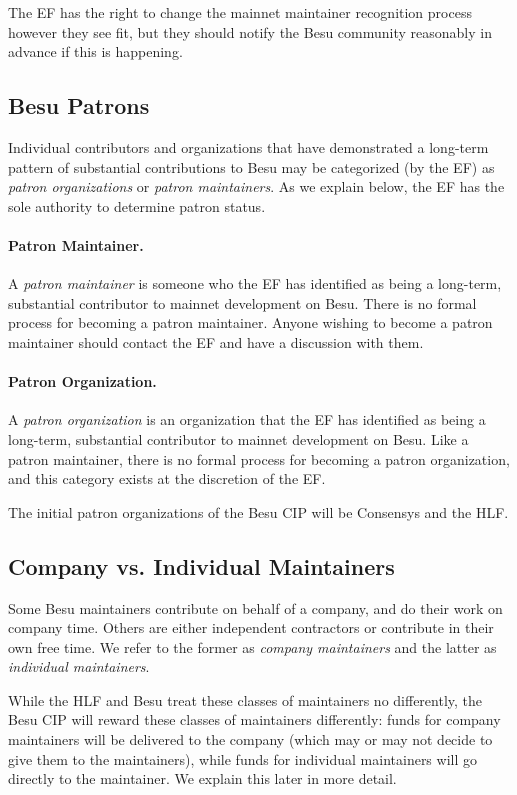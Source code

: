 The EF has the right to change the mainnet maintainer recognition process however they see fit, but they should notify the Besu community reasonably in advance if this is happening.

\subsection{Besu Patrons}
Individual contributors and organizations that have demonstrated a long-term pattern of substantial contributions to Besu may be categorized (by the EF) as \emph{patron organizations} or \emph{patron maintainers}.  As we explain below, the EF has the sole authority to determine patron status.

\paragraph{Patron Maintainer.}  A \emph{patron maintainer} is someone who the EF has identified as being a long-term, substantial contributor to mainnet development on Besu.  There is no formal process for becoming a patron maintainer.  Anyone wishing to become a patron maintainer should contact the EF and have a discussion with them.

\paragraph{Patron Organization.}  A \emph{patron organization} is an organization that the EF has identified as being a long-term, substantial contributor to mainnet development on Besu.  Like a patron maintainer, there is no formal process for becoming a patron organization, and this category exists at the discretion of the EF.

The initial patron organizations of the Besu CIP will be Consensys and the HLF.

\subsection{Company vs. Individual Maintainers}
Some Besu maintainers contribute on behalf of a company, and do their work on company time.  Others are either independent contractors or contribute in their own free time.  We refer to the former as \emph{company maintainers} and the latter as \emph{individual maintainers}.

While the HLF and Besu treat these classes of maintainers no differently, the Besu CIP will reward these classes of maintainers differently:  funds for company maintainers will be delivered to the company (which may or may not decide to give them to the maintainers), while funds for individual maintainers will go directly to the maintainer.  We explain this later in more detail.

